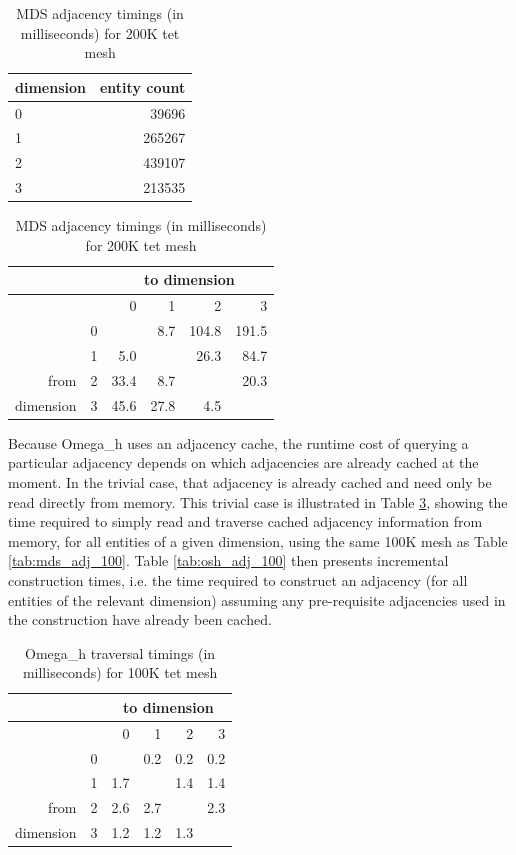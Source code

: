 \begin{table}
\caption{MDS adjacency timings (in milliseconds) for 200K tet mesh}
\label{tab:mds_adj_200}
\begin{center}
\begin{tabular}{l|r|}
dimension & entity count \\\hline
0 & 39696  \\
1 & 265267 \\
2 & 439107 \\
3 & 213535 \\
\end{tabular}
\begin{tabular}{|r|r|r r r r}
               &   & \multicolumn{4}{c}{to dimension} \\\hline
               &   &    0 &    1 &     2 &     3 \\\hline
               & 0 &      &  8.7 & 104.8 & 191.5 \\
               & 1 &  5.0 &      &  26.3 &  84.7 \\
from           & 2 & 33.4 &  8.7 &       &  20.3 \\
dimension      & 3 & 45.6 & 27.8 &   4.5 &       \\
\end{tabular}
\end{center}
\end{table}

Because Omega\_h uses an adjacency cache, the runtime cost
of querying a particular adjacency depends on which adjacencies
are already cached at the moment.
In the trivial case, that adjacency is already cached and
need only be read directly from memory.
This trivial case is illustrated in Table \ref{tab:osh_walk_100},
showing the time required to simply read and traverse cached adjacency
information from memory, for all entities of a given dimension,
using the same 100K mesh as Table \ref{tab:mds_adj_100}.
Table \ref{tab:osh_adj_100} then presents incremental construction
times, i.e. the time required to construct an adjacency
(for all entities of the relevant dimension)
assuming any pre-requisite adjacencies used in the construction
have already been cached.

\begin{table}
\caption{Omega\_h traversal timings (in milliseconds) for 100K tet mesh}
\label{tab:osh_walk_100}
\begin{center}
\begin{tabular}{|r|r|r r r r}
               &   & \multicolumn{4}{c}{to dimension} \\\hline
               &   &    0 &    1 &    2 &   3  \\\hline
               & 0 &      &  0.2 &  0.2 &  0.2 \\
               & 1 &  1.7 &      &  1.4 &  1.4 \\
from           & 2 &  2.6 &  2.7 &      &  2.3 \\
dimension      & 3 &  1.2 &  1.2 &  1.3 &      \\
\end{tabular}
\end{center}
\end{table}

